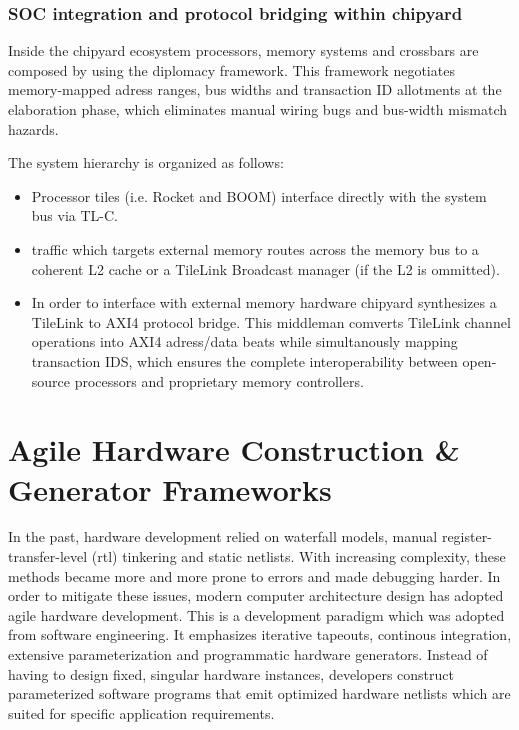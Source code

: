 \subsubsection{SOC integration and protocol bridging within chipyard}

Inside the chipyard ecosystem processors, memory systems and crossbars are composed by using the diplomacy framework. \cite{amid2020chipyard}
This framework negotiates memory-mapped adress ranges, bus widths and transaction ID allotments at the elaboration phase,
which eliminates manual wiring bugs and bus-width mismatch hazards.

The system hierarchy is organized as follows: %

\begin{itemize}
  \item Processor tiles (i.e. Rocket and \gls{BOOM}) interface directly with the system bus via TL-C.  %
  \item traffic which targets external memory routes across the memory bus to a coherent L2 cache or a TileLink Broadcast manager (if the L2 is ommitted).
  \item In order to interface with external memory hardware chipyard synthesizes a TileLink to AXI4 protocol bridge.
    This middleman comverts TileLink channel operations into \gls{AXI4} adress/data beats while simultanously mapping transaction IDS,
    which ensures the complete interoperability between open-source processors and proprietary memory controllers.
\end{itemize}

\section{Agile Hardware Construction \& Generator Frameworks}

In the past, hardware development relied on waterfall models, manual register-transfer-level (\gls{rtl}) tinkering and static netlists.
With increasing complexity, these methods became more and more prone to errors and made debugging harder.
In order to mitigate these issues, modern computer architecture design has adopted agile hardware development. \cite{lee2016agile}
This is a development paradigm which was adopted from software engineering.
It emphasizes iterative tapeouts, continous integration, extensive parameterization and programmatic hardware generators.
Instead of having to design fixed, singular hardware instances,
developers construct parameterized software programs that emit optimized hardware netlists which are suited for specific application requirements.

